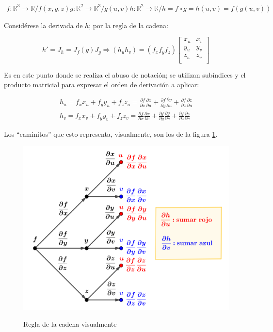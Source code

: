 \documentclass{article}
\renewcommand{\Bbb}{\mathbb}
\begin{document}
\begin{gather}
f: \Bbb R^3 \rightarrow \Bbb R / f(x, y, z)
g: \Bbb R^2 \rightarrow \Bbb R^3 / \overline{g}(u, v)
h: \Bbb R^2 \rightarrow \Bbb R / h = f \circ g = h(u, v) = f(g(u,v))
\end{gather}

Considérese la derivada de $h$; por la regla de la cadena:

\begin{equation}
h' = J_h = J_f(g) J_g \Rightarrow (h_u h_v) = (f_x f_y f_z) 
\begin{bmatrix}
x_u & x_v \\
y_u & y_v \\
z_u & z_v \\
\end{bmatrix}
\end{equation}

Es en este punto donde se realiza el abuso de notación; se utilizan subíndices y el producto matricial para expresar el orden de derivación a aplicar:

\begin{subequations}
\begin{gather}
h_u = f_x x_u + f_y y_u + f_z z_u = \frac{\partial f}{\partial x} \frac{\partial x}{\partial u} + \frac{\partial f}{\partial y} \frac{\partial y}{\partial u} + \frac{\partial f}{\partial z} \frac{\partial z}{\partial u} \\
h_v = f_x x_v + f_y y_v + f_z z_v = \frac{\partial f}{\partial x} \frac{\partial x}{\partial v} + \frac{\partial f}{\partial y} \frac{\partial y}{\partial v} + \frac{\partial f}{\partial z} \frac{\partial z}{\partial v}
\end{gather}
\end{subequations}

Los ``caminitos'' que esto representa, visualmente, son los de la figura \ref{fig:rc2}.

\begin{figure}[ht]
\caption{Regla de la cadena visualmente}
\includegraphics[scale=0.7]{img/teo_fig013_rc2.png} 
\centering
\label{fig:rc2}
\end{figure}
\end{document}
